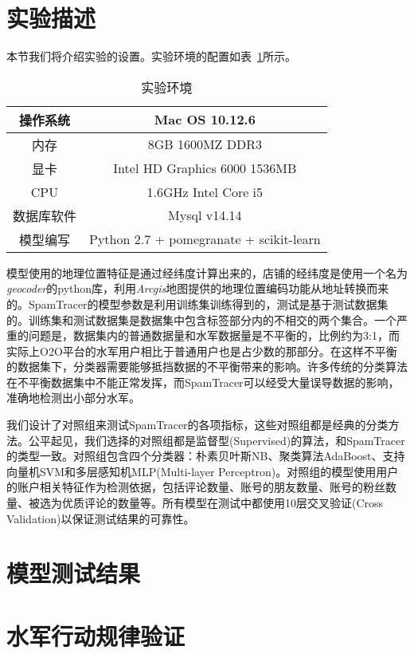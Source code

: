 \section{实验描述}

本节我们将介绍实验的设置。实验环境的配置如表~\ref{tab:environment}所示。

\begin{table}[htbp]
	\caption[实验环境]{实验环境}
	\label{tab:environment}
	\centering
	\begin{tabular}{| c | c |}
		\hline
		\centering
		操作系统 &  Mac OS 10.12.6\\
		\hline
		\centering
		内存 & 8GB 1600MZ DDR3\\
		\hline
		\centering
		显卡 & Intel HD Graphics 6000 1536MB\\
		\hline
		\centering
		CPU & 1.6GHz Intel Core i5\\
		\hline
		\centering
		数据库软件 & Mysql v14.14\\
		\hline
		\centering
		模型编写 & Python 2.7 + pomegranate +
		scikit-learn\\
		\hline
	\end{tabular}
\end{table}

模型使用的地理位置特征是通过经纬度计算出来的，店铺的经纬度是使用一个名为\emph{geocoder}的python库，利用\emph{Arcgis}地图提供的地理位置编码功能从地址转换而来的。SpamTracer的模型参数是利用训练集训练得到的，测试是基于测试数据集的。训练集和测试数据集是数据集中包含标签部分内的不相交的两个集合。一个严重的问题是，数据集内的普通数据量和水军数据量是不平衡的，比例约为3:1，而实际上O2O平台的水军用户相比于普通用户也是占少数的那部分。在这样不平衡的数据集下，分类器需要能够抵挡数据的不平衡带来的影响。许多传统的分类算法在不平衡数据集中不能正常发挥，而SpamTracer可以经受大量误导数据的影响，准确地检测出小部分水军。

我们设计了对照组来测试SpamTracer的各项指标，这些对照组都是经典的分类方法。公平起见，我们选择的对照组都是监督型(Supervised)的算法，和SpamTracer的类型一致。对照组包含四个分类器：朴素贝叶斯NB、聚类算法AdaBoost、支持向量机SVM和多层感知机MLP(Multi-layer Perceptron)。对照组的模型使用用户的账户相关特征作为检测依据，包括评论数量、账号的朋友数量、账号的粉丝数量、被选为优质评论的数量等。所有模型在测试中都使用10层交叉验证(Cross Validation)以保证测试结果的可靠性。



\section{模型测试结果}




\section{水军行动规律验证}